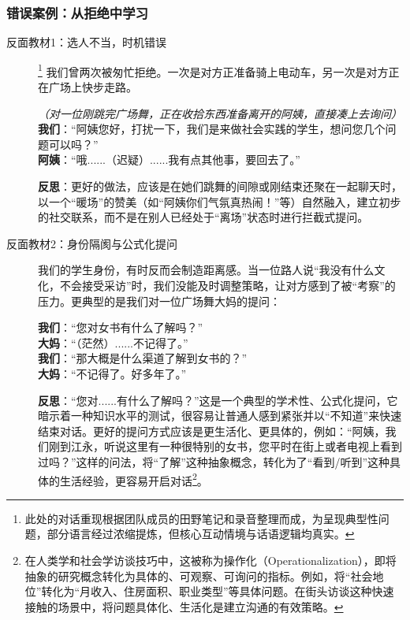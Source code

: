 \documentclass[UTF8]{ctexart}
\begin{document}
\subsubsection{错误案例：从拒绝中学习}
\begin{description}
    \item[反面教材1：选人不当，时机错误]\footnote[1]{此处的对话重现根据团队成员的田野笔记和录音整理而成，为呈现典型性问题，部分语言经过浓缩提炼，但核心互动情境与话语逻辑均真实。}
    我们曾两次被匆忙拒绝。一次是对方正准备骑上电动车，另一次是对方正在广场上快步走路。
    
    \begin{dialogue}
        \textit{（对一位刚跳完广场舞，正在收拾东西准备离开的阿姨，直接凑上去询问）} \\
        \textbf{我们}：“阿姨您好，打扰一下，我们是来做社会实践的学生，想问您几个问题可以吗？” \\
        \textbf{阿姨}：“哦......（迟疑）......我有点其他事，要回去了。”
    \end{dialogue}

    \textbf{反思}：更好的做法，应该是在她们跳舞的间隙或刚结束还聚在一起聊天时，以一个“暖场”的赞美（如“阿姨你们气氛真热闹！”等）自然融入，建立初步的社交联系，而不是在别人已经处于“离场”状态时进行拦截式提问。

    \item[反面教材2：身份隔阂与公式化提问]
    我们的学生身份，有时反而会制造距离感。当一位路人说“我没有什么文化，不会接受采访”时，我们没能及时调整策略，让对方感到了被“考察”的压力。更典型的是我们对一位广场舞大妈的提问：
    
    \begin{dialogue}
        \textbf{我们}：“您对女书有什么了解吗？” \\
        \textbf{大妈}：“（茫然）......不记得了。” \\
        \textbf{我们}：“那大概是什么渠道了解到女书的？” \\
        \textbf{大妈}：“不记得了。好多年了。”
    \end{dialogue}
    
    \textbf{反思}：“您对......有什么了解吗？”这是一个典型的学术性、公式化提问，它暗示着一种知识水平的测试，很容易让普通人感到紧张并以“不知道”来快速结束对话。更好的提问方式应该是更生活化、更具体的，例如：“阿姨，我们刚到江永，听说这里有一种很特别的女书，您平时在街上或者电视上看到过吗？”这样的问法，将“了解”这种抽象概念，转化为了“看到/听到”这种具体的生活经验，更容易开启对话\footnote[2]{在人类学和社会学访谈技巧中，这被称为操作化（Operationalization），即将抽象的研究概念转化为具体的、可观察、可询问的指标。例如，将“社会地位”转化为“月收入、住房面积、职业类型”等具体问题。在街头访谈这种快速接触的场景中，将问题具体化、生活化是建立沟通的有效策略。}。
\end{description}
\end{document}

